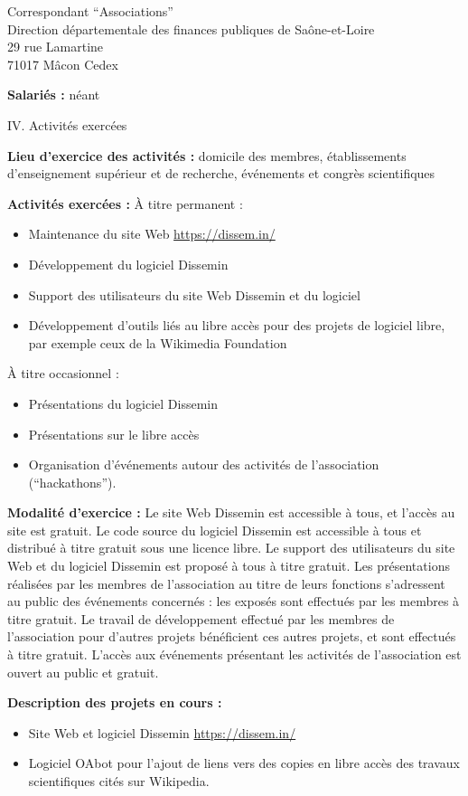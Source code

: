 \documentclass[11pt]{lettre}
\begin{document}
\begin{letter}{Correspondant ``Associations''\\Direction départementale des finances publiques de Saône-et-Loire\\29 rue Lamartine\\71017 Mâcon Cedex}
  \medskip

  \textbf{Salariés :} néant

  \bigskip
  \bigskip
  {\Large IV. Activités exercées}

  \textbf{Lieu d'exercice des activités :} domicile des membres, établissements
  d'enseignement supérieur et de recherche, événements et congrès scientifiques

  \textbf{Activités exercées :} À titre permanent :

  \begin{itemize}
    \item Maintenance du site Web \url{https://dissem.in/}
    \item Développement du logiciel Dissemin
    \item Support des utilisateurs du site Web Dissemin et du logiciel
    \item Développement d'outils liés au libre accès pour des projets de
      logiciel libre, par exemple ceux de la Wikimedia Foundation
  \end{itemize}

  À titre occasionnel :

  \begin{itemize}
    \item Présentations du logiciel Dissemin
    \item Présentations sur le libre accès
    \item Organisation d'événements autour des activités de l'association
      (``hackathons'').
  \end{itemize}

  \textbf{Modalité d'exercice :} Le site Web Dissemin est accessible à tous, et
  l'accès au site est gratuit. Le code source du logiciel Dissemin est
  accessible à tous et distribué à titre gratuit sous une licence libre. Le
  support des utilisateurs du site Web et du logiciel Dissemin est proposé à
  tous à titre gratuit. Les présentations réalisées par les membres de
  l'association au titre de leurs fonctions s'adressent au public des événements
  concernés : les exposés sont effectués par les membres à titre gratuit. Le
  travail de développement effectué par les membres de l'association pour
  d'autres projets bénéficient ces autres projets, et sont effectués à titre
  gratuit. L'accès aux événements présentant les activités de l'association est
  ouvert au public et gratuit.

  \textbf{Description des projets en cours :}

  \begin{itemize}
    \item Site Web et logiciel Dissemin \url{https://dissem.in/}
    \item Logiciel OAbot pour l'ajout de liens vers des copies en libre accès
      des travaux scientifiques cités sur Wikipedia.
  \end{itemize}


\end{letter}
\end{document}

